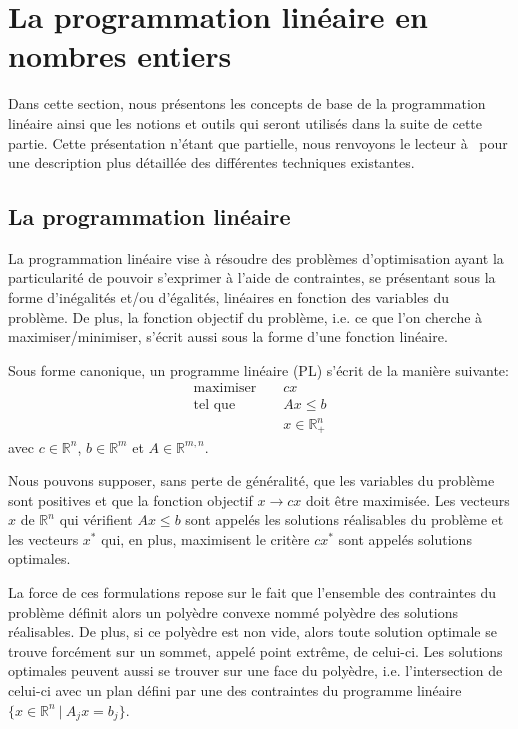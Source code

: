 
\section{La programmation linéaire en nombres entiers}
\label{sec:PLNE}
Dans cette section, nous présentons les concepts de base de la
programmation linéaire ainsi que les notions et outils qui seront
utilisés dans la suite de cette partie. Cette présentation n'étant que
partielle, nous renvoyons le lecteur à~\cite{LP} pour une description
plus détaillée des différentes techniques existantes.

\subsection{La programmation linéaire}

La programmation linéaire vise à résoudre des problèmes
d'optimisation ayant la particularité de pouvoir s'exprimer à
l'aide de contraintes, se présentant sous la forme d'inégalités
et/ou d'égalités, linéaires en fonction des variables du problème.
De plus, la fonction objectif du problème, i.e. ce que l'on
cherche à maximiser/minimiser, s'écrit aussi sous la forme d'une
fonction linéaire.

Sous forme canonique, un programme linéaire (PL) s'écrit de la manière
suivante: 
 \[ \begin{array}{lcl}
\text{maximiser } & & \displaystyle cx\\ 
\text{tel que }& & \displaystyle Ax \le b\\
 & & \displaystyle x \in \mathbb{R}^n_+
 \end{array}
\]
avec $c \in \mathbb{R}^n$, $b \in \mathbb{R}^m$ et $A \in
\mathbb{R}^{m,n}$. 

Nous pouvons supposer, sans perte de généralité, que les variables du
problème sont positives et que la fonction objectif $x\rightarrow cx$
doit être maximisée. Les vecteurs $x$ de $\mathbb{R}^n$ qui vérifient
$Ax \le b$ sont appelés les solutions réalisables du problème et les
vecteurs $x^*$ qui, en plus, maximisent le critère $cx^*$ sont appelés
solutions optimales.    

La force de ces formulations repose sur le fait que l'ensemble des
contraintes du problème définit alors un polyèdre convexe nommé
polyèdre des solutions réalisables. De plus, si ce polyèdre est non
vide, alors toute solution optimale se trouve forcément sur un sommet,
appelé point extrême, de celui-ci. Les solutions optimales peuvent aussi
se trouver sur une face du polyèdre, i.e. l'intersection de celui-ci
avec un plan défini par une des contraintes du programme linéaire $\{x
\in \mathbb{R}^n\ | \ A_jx=b_j\}$. 

